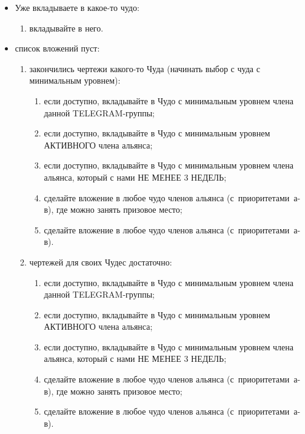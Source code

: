 \begin{itemize}
    \item  Уже вкладываете в какое-то чудо:
    \begin{enumerate}
        \item вкладывайте в него.
    \end{enumerate}
    
    \item список вложений пуст:
    \begin{enumerate}
        \item закончились чертежи какого-то Чуда (начинать выбор с чуда с минимальным уровнем):
        \begin{enumerate}
            \item если доступно, вкладывайте в Чудо с минимальным уровнем члена данной TELEGRAM-группы;
            \item если доступно, вкладывайте в Чудо с минимальным уровнем АКТИВНОГО члена альянса;
            \item если доступно, вкладывайте в Чудо с минимальным уровнем члена альянса, который с нами НЕ МЕНЕЕ 3 НЕДЕЛЬ;
            \item сделайте вложение в любое чудо членов альянса (с~приоритетами~а-в), где можно занять призовое место;
            \item сделайте вложение в любое чудо членов альянса (с~приоритетами~а-в).
        \end{enumerate}
        \item чертежей для своих Чудес достаточно:
        \begin{enumerate}
            \item если доступно, вкладывайте в Чудо с минимальным уровнем члена данной TELEGRAM-группы;
            \item если доступно, вкладывайте в Чудо с минимальным уровнем АКТИВНОГО члена альянса;
            \item если доступно, вкладывайте в Чудо с минимальным уровнем члена альянса, который с нами НЕ МЕНЕЕ 3 НЕДЕЛЬ;
            \item сделайте вложение в любое чудо членов альянса (с~приоритетами~а-в), где можно занять призовое место;
            \item сделайте вложение в любое чудо членов альянса (с~приоритетами~а-в).
        \end{enumerate}
    \end{enumerate}
\end{itemize}

